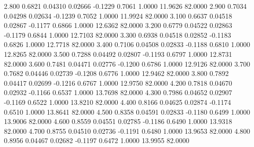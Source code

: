    2.800   0.6821   0.04310   0.02666  -0.1229   0.7061   1.0000  11.9626  82.0000
   2.900   0.7034   0.04298   0.02634  -0.1239   0.7052   1.0000  11.9924  82.0000
   3.100   0.6637   0.04518   0.02867  -0.1177   0.6866   1.0000  12.6362  82.0000
   3.200   0.6779   0.04522   0.02863  -0.1179   0.6844   1.0000  12.7103  82.0000
   3.300   0.6938   0.04518   0.02852  -0.1183   0.6826   1.0000  12.7718  82.0000
   3.400   0.7106   0.04508   0.02833  -0.1188   0.6810   1.0000  12.8265  82.0000
   3.500   0.7288   0.04492   0.02807  -0.1193   0.6797   1.0000  12.8731  82.0000
   3.600   0.7481   0.04471   0.02776  -0.1200   0.6786   1.0000  12.9126  82.0000
   3.700   0.7682   0.04446   0.02739  -0.1208   0.6776   1.0000  12.9462  82.0000
   3.800   0.7892   0.04417   0.02699  -0.1216   0.6767   1.0000  12.9750  82.0000
   4.200   0.7818   0.04670   0.02932  -0.1166   0.6537   1.0000  13.7698  82.0000
   4.300   0.7986   0.04652   0.02907  -0.1169   0.6522   1.0000  13.8210  82.0000
   4.400   0.8166   0.04625   0.02874  -0.1174   0.6510   1.0000  13.8641  82.0000
   4.500   0.8358   0.04591   0.02833  -0.1180   0.6499   1.0000  13.9006  82.0000
   4.600   0.8559   0.04551   0.02785  -0.1186   0.6490   1.0000  13.9318  82.0000
   4.700   0.8755   0.04510   0.02736  -0.1191   0.6480   1.0000  13.9653  82.0000
   4.800   0.8956   0.04467   0.02682  -0.1197   0.6472   1.0000  13.9955  82.0000
